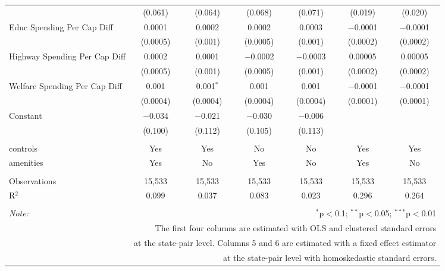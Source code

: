 \begin{table}[!htbp]
\begin{tabular}{@{\extracolsep{5pt}}lcccccc}
  & (0.061) & (0.064) & (0.068) & (0.071) & (0.019) & (0.020) \\ 
  Educ Spending Per Cap Diff & 0.0001 & 0.0002 & 0.0002 & 0.0003 & $-$0.0001 & $-$0.0001 \\ 
  & (0.0005) & (0.001) & (0.0005) & (0.001) & (0.0002) & (0.0002) \\ 
  Highway Spending Per Cap Diff & 0.0002 & 0.0001 & $-$0.0002 & $-$0.0003 & 0.00005 & 0.00005 \\ 
  & (0.0005) & (0.001) & (0.0005) & (0.001) & (0.0002) & (0.0002) \\ 
  Welfare Spending Per Cap Diff & 0.001 & 0.001$^{*}$ & 0.001 & 0.001 & $-$0.0001 & $-$0.0001 \\ 
  & (0.0004) & (0.0004) & (0.0004) & (0.0004) & (0.0001) & (0.0001) \\ 
  Constant & $-$0.034 & $-$0.021 & $-$0.030 & $-$0.006 &  &  \\ 
  & (0.100) & (0.112) & (0.105) & (0.113) &  &  \\ 
 \hline \\[-1.8ex] 
controls & Yes & Yes & No & No & Yes & Yes \\ 
amenities & Yes & No & Yes & No & Yes & No \\ 
\hline \\[-1.8ex] 
Observations & 15,533 & 15,533 & 15,533 & 15,533 & 15,533 & 15,533 \\ 
R$^{2}$ & 0.099 & 0.037 & 0.083 & 0.023 & 0.296 & 0.264 \\ 
\hline 
\hline \\[-1.8ex] 
\textit{Note:}  & \multicolumn{6}{r}{$^{*}$p$<$0.1; $^{**}$p$<$0.05; $^{***}$p$<$0.01} \\ 
 & \multicolumn{6}{r}{The first four columns are estimated with OLS and clustered standard errors} \\ 
 & \multicolumn{6}{r}{at the state-pair level. Columns 5 and 6 are estimated with a fixed effect estimator} \\ 
 & \multicolumn{6}{r}{at the state-pair level with homoskedastic standard errors.} \\ 
\end{tabular} 
\end{table} 
